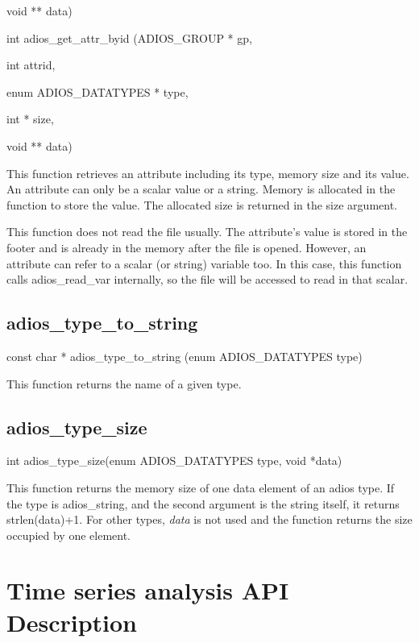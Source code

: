 \parindent=72pt
void                 ** data)

\parindent=0pt
int adios\_get\_attr\_byid (ADIOS\_GROUP           * gp,

\parindent=90pt
int                     attrid,

enum ADIOS\_DATATYPES  * type,

\parindent=180pt
int                   * size,

\parindent=90pt
void                 ** data)

\parindent=0pt
This function retrieves an attribute including its type, memory size and its value. 
An attribute can only be a scalar value or a string. Memory is allocated in the 
function to store the value. The allocated size is returned in the size argument. 

This function does not read the file usually. The attribute's value is stored in 
the footer and is already in the memory after the file is opened. However, an attribute 
can refer to a scalar (or string) variable too. In this case, this function calls 
adios\_read\_var internally, so the file will be accessed to read in that scalar. 
\label{HToc182553409}

\subsection{adios\_type\_to\_string}

const char * adios\_type\_to\_string (enum ADIOS\_DATATYPES type)

This function returns the name of a given type.\label{HToc182553410}

\subsection{adios\_type\_size}

int adios\_type\_size(enum ADIOS\_DATATYPES type, void *data)

This function returns the memory size of one data element of an adios type. If 
the type is adios\_string, and the second argument is the string itself, it returns 
strlen(data)+1. For other types, \textit{data} is not used and the function returns 
the size occupied by one element.\label{HToc182553411}

\section{Time series analysis API Description}

